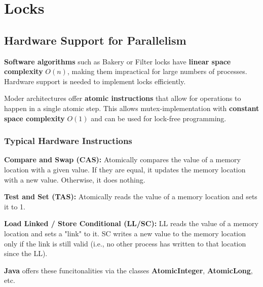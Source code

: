 \section{Locks}

\subsection{Hardware Support for Parallelism}

\begin{remark}
    \textbf{Software algorithms} such as Bakery or Filter locks have \textbf{linear space complexity} $O(n)$, making them impractical for large numbers of processes. Hardware support is needed to implement locks efficiently.
\end{remark}

\begin{remark}
    Moder architectures offer \textbf{atomic instructions} that allow for operations to happen in a single atomic step. This allows mutex-implementation with \textbf{constant space complexity} $O(1)$ and can be used for lock-free programming.
\end{remark}

\subsubsection{Typical Hardware Instructions}

\begin{definition}
    \textbf{Compare and Swap (CAS):} Atomically compares the value of a memory location with a given value. If they are equal, it updates the memory location with a new value. Otherwise, it does nothing.
\end{definition}

\begin{definition}
    \textbf{Test and Set (TAS):} Atomically reads the value of a memory location and sets it to 1.
\end{definition}

\begin{definition}
    \textbf{Load Linked / Store Conditional (LL/SC): } LL reads the value of a memory location and sets a "link" to it. SC writes a new value to the memory location only if the link is still valid (i.e., no other process has written to that location since the LL).
\end{definition}

\begin{remark}
    \textbf{Java} offers these funcitonalities via the classes \textbf{AtomicInteger}, \textbf{AtomicLong}, etc.
\end{remark}

